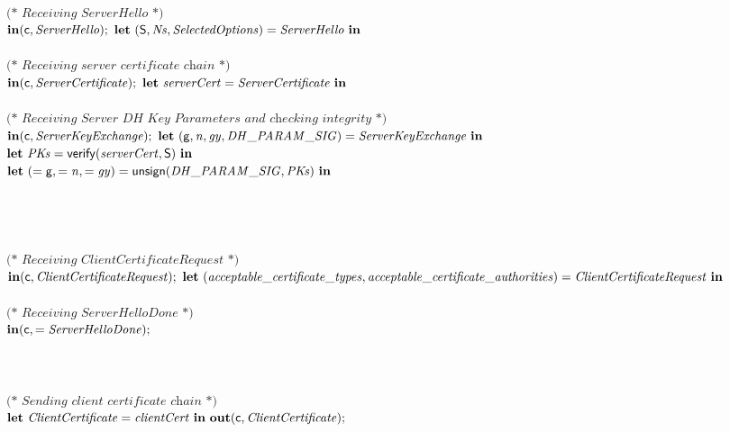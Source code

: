 \begin{tabbing}
$\qquad\qquad $\\
$\qquad\qquad \textit{(* Receiving ServerHello *)}$\\
$\qquad\qquad \mathbf{in}(\mathsf{c}, \mathit{ServerHello});\ \mathbf{let}\ (\mathsf{S}, \mathit{Ns}, \mathit{SelectedOptions}) = \mathit{ServerHello}\ \mathbf{in}$\\
$\qquad\qquad $\\
$\qquad\qquad \textit{(* Receiving server certificate chain *)}$\\
$\qquad\qquad \mathbf{in}(\mathsf{c}, \mathit{ServerCertificate});\ \mathbf{let}\ \mathit{serverCert} = \mathit{ServerCertificate}\ \mathbf{in}$\\
$\qquad\qquad $\\
$\qquad\qquad \textit{(* Receiving Server DH Key Parameters and checking integrity *)}$\\
$\qquad\qquad \kwl{in}(\kwc{c}, \var{ServerKeyExchange});\ \kwl{let}\ (\kwf{g}, \var{n}, \var{gy}, \var{DH{\_}PARAM{\_}SIG}) = \var{ServerKeyExchange}\ \kwl{in}$\\
$\qquad\qquad \mathbf{let}\ \mathit{PKs} = \mathsf{verify}(\mathit{serverCert}, \mathsf{S})\ \mathbf{in}$\\
$\qquad\qquad \mathbf{let}\ ( = \mathsf{g},  = \mathit{n},  = \mathit{gy}) = \mathsf{unsign}(\mathit{DH{\_}PARAM{\_}SIG}, \mathit{PKs})\ \mathbf{in}$\\
$\qquad\qquad $\\
$\qquad\qquad $\\
$\qquad\qquad $\\
$\qquad\qquad $\\
$\qquad\qquad \textit{(* Receiving ClientCertificateRequest *)}$\\
$\qquad\qquad \kwl{in}(\kwc{c}, \var{ClientCertificateRequest});\ \kwl{let}\ (\var{acceptable{\_}certificate{\_}types}, \var{acceptable{\_}certificate{\_}authorities}) = \var{ClientCertificateRequest}\ \kwl{in}$\\
$\qquad\qquad $\\
$\qquad\qquad \textit{(* Receiving ServerHelloDone *)}$\\
$\qquad\qquad \mathbf{in}(\mathsf{c},  = \mathit{ServerHelloDone});$\\
$\qquad\qquad $\\
$\qquad\qquad $\\
$\qquad\qquad $\\
$\qquad\qquad \textit{(* Sending client certificate chain *)}$\\
$\qquad\qquad \kwl{let}\ \var{ClientCertificate} = \var{clientCert}\ \kwl{in}\ \kwl{out}(\kwc{c}, \var{ClientCertificate});$\\

\end{tabbing}
